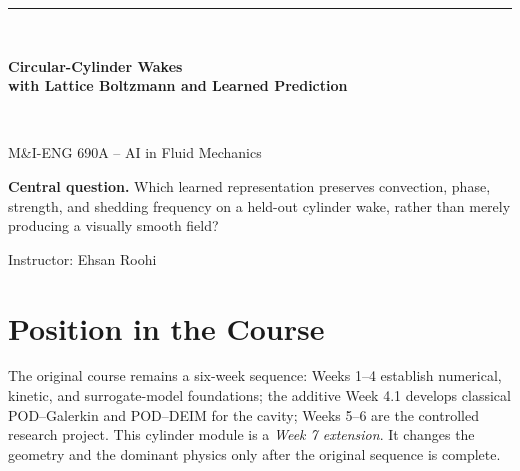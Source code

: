 \documentclass[11pt]{article}
\begin{document}
\hypersetup{pageanchor=false}
\begin{titlepage}
\centering\vspace*{1.0cm}
{\color{black}\rule{\textwidth}{2pt}}\\[0.5cm]
{\Huge\bfseries Circular-Cylinder Wakes\\[0.18cm]with Lattice Boltzmann and Learned Prediction\par}
\vspace{0.35cm}{\Large Week 7 Extension Lecture Notes\par}
\vspace{0.5cm}{\color{black}\rule{\textwidth}{2pt}}\\[0.9cm]
{\Large M\&I-ENG 690A -- AI in Fluid Mechanics\par}
\vspace{0.25cm}{\large Summer 2026\par}
\vfill
\begin{tcolorbox}[colback=lightblue,colframe=blue,width=0.92\textwidth]
\textbf{Central question.} Which learned representation preserves convection, phase, strength, and shedding frequency on a held-out cylinder wake, rather than merely producing a visually smooth field?
\end{tcolorbox}
\vfill{\large Instructor: Ehsan Roohi\par}
\end{titlepage}

\hypersetup{pageanchor=true}
\tableofcontents\newpage
{}

\section{Position in the Course}
The original course remains a six-week sequence: Weeks 1--4 establish numerical, kinetic, and surrogate-model foundations; the additive Week 4.1 develops classical POD--Galerkin and POD--DEIM for the cavity; Weeks 5--6 are the controlled research project. This cylinder module is a \emph{Week 7 extension}. It changes the geometry and the dominant physics only after the original sequence is complete.
\end{document}
